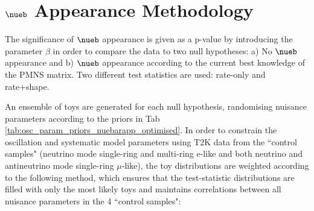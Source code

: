 \section {$\nueb$ Appearance Methodology}
\label{sec:method}


The significance of $\nueb$ appearance is given as a p-value by introducing the parameter $\beta$ in order to compare the data to two null hypotheses: a) No $\nueb$ appearance and b) $\nueb$ appearance according to the current best knowledge of the PMNS matrix. Two different test statistics are used: rate-only and rate+shape. 

An ensemble of toys are generated for each null hypothesis, randomising nuisance parameters according to the priors in Tab \ref{tab:osc_param_priors_nuebarapp_optimised}. In order to constrain the oscillation and systematic model parameters using T2K data from the ``control samples" (neutrino mode single-ring and multi-ring e-like and both neutrino and antineutrino mode single-ring $\mu$-like), the toy distributions are weighted according to the following method, which ensures that the test-statistic distributions are filled with only the most likely toys and maintains correlations between all nuisance parameters in the 4 ``control samples":

